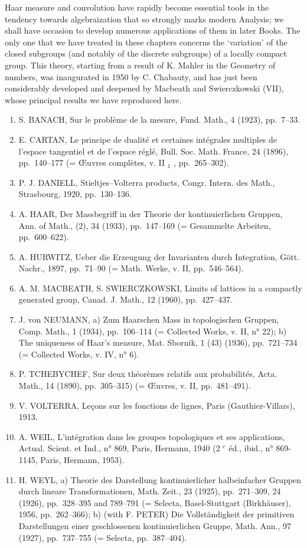Haar measure and convolution have rapidly become essential tools in the tendency towards algebraization that so strongly marks modern Analysis; we shall have occasion to develop numerous applications of them in later Books. The only one that we have treated in these chapters concerns the `variation' of the closed subgroups (and notably of the discrete subgroups) of a locally compact group. This theory, starting from a result of K. Mahler in the Geometry of numbers, was inaugurated in 1950 by C. Chabauty, and has just been considerably developed and deepened by Macbeath and Swierczkowski (VII), whose principal results we have reproduced here.


\begin{enumerate}
\def\labelenumi{(\Roman{enumi})}
\item
  S. BANACH, Sur le problème de la mesure, Fund. Math., 4 (1923), pp.~7--33.
\item
  E. CARTAN, Le principe de dualité et certaines intégrales multiples de l'espace tangentiel et de l'espace réglé, Bull. Soc. Math. France, 24 (1896), pp.~140--177 (= Œuvres complètes, v. II \(_{1}\) , pp.~265--302).
\item
  P. J. DANIELL, Stieltjes--Volterra products, Congr. Intern. des Math., Strasbourg, 1920, pp.~130--136.
\item
  A. HAAR, Der Massbegriff in der Theorie der kontinuierlichen Gruppen, Ann. of Math., (2), 34 (1933), pp.~147--169 (= Gesammelte Arbeiten, pp.~600--622).
\item
  A. HURWITZ, Ueber die Erzeugung der Invarianten durch Integration, Gött. Nachr., 1897, pp.~71--90 (= Math. Werke, v. II, pp.~546--564).
\item
  A. M. MACBEATH, S. SWIERCZKOWSKI, Limits of lattices in a compactly generated group, Canad. J. Math., 12 (1960), pp.~427--437.
\item
  J. von NEUMANN, a) Zum Haarschen Mass in topologischen Gruppen, Comp. Math., 1 (1934), pp.~106--114 (= Collected Works, v. II, n° 22); b) The uniqueness of Haar's measure, Mat. Sbornik, 1 (43) (1936), pp.~721--734 (= Collected Works, v. IV, n° 6).
\item
  P. TCHEBYCHEF, Sur deux théorèmes relatifs aux probabilités, Acta. Math., 14 (1890), pp.~305--315) (= Œuvres, v. II, pp.~481--491).
\item
  V. VOLTERRA, Leçons sur les fonctions de lignes, Paris (Gauthier-Villars), 1913.
\item
  A. WEIL, L'intégration dans les groupes topologiques et ses applications, Actual. Scient. et Ind., n° 869, Paris, Hermann, 1940 (2 \(^{e}\) éd., ibid., n° 869-1145, Paris, Hermann, 1953).
\item
  H. WEYL, a) Theorie des Darstellung kontinuierlicher halbeinfacher Gruppen durch lineare Transformationen, Math. Zeit., 23 (1925), pp.~271--309, 24 (1926), pp.~328--395 and 789--791 (= Selecta, Basel-Stuttgart (Birkhäuser), 1956, pp.~262--366); b) (with F. PETER) Die Vollständigkeit der primitiven Darstellungen einer geschlossenen kontinuierlichen Gruppe, Math. Ann., 97 (1927), pp.~737--755 (= Selecta, pp.~387--404).
\end{enumerate}

